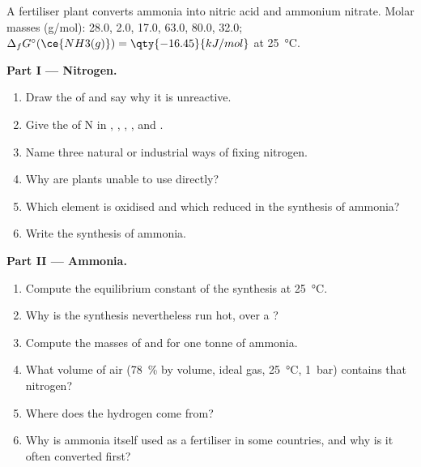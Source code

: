 \begin{problem}
\label{pb:b1:p-block-13-15:1}
A fertiliser plant converts ammonia into nitric acid and ammonium
nitrate. Molar masses (\unit{g/mol}):  28.0,  2.0, 
17.0,  63.0,  80.0,  32.0;
$\Delta_f G^\circ(\ce{NH3(g)}) = \qty{-16.45}{kJ/mol}$ at
\qty{25}{\celsius}.

\medskip
\noindent\textbf{Part I --- Nitrogen.}
\begin{enumerate}
  \item Draw the  of  and say why it is unreactive.
  \item Give the  of N in , , ,
        ,  and .
  \item Name three natural or industrial ways of fixing nitrogen.
  \item Why are plants unable to use  directly?
  \item Which element is oxidised and which reduced in the synthesis of
        ammonia?
  \item Write the synthesis of ammonia.
\end{enumerate}

\medskip
\noindent\textbf{Part II --- Ammonia.}
\begin{enumerate}[resume]
  \item Compute the equilibrium constant of the synthesis at
        \qty{25}{\celsius}.
  \item Why is the synthesis nevertheless run hot, over a ?
  \item Compute the masses of  and  for one tonne of
        ammonia.
  \item What volume of air (\qty{78}{\percent}  by volume, ideal
        gas, \qty{25}{\celsius}, \qty{1}{bar}) contains that nitrogen?
  \item Where does the hydrogen come from?
  \item Why is ammonia itself used as a fertiliser in some countries, and
        why is it often converted first?
\end{enumerate}


\end{problem}
